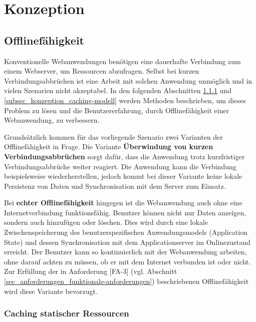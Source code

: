 \chapter{Konzeption}
\label{sec_konzeption}

\section{Offlinefähigkeit}
\label{sec_konzeption_offline}

Konventionelle Webanwendungen benötigen eine dauerhafte Verbindung zum einem Webserver, um Ressourcen abzufragen. Selbst bei kurzen Verbindungsabbrüchen ist eine Arbeit mit solchen Anwendung unmöglich und in vielen Szenarien nicht akzeptabel. In den folgenden Abschnitten \ref{subsec_konzept_caching-statische-ressourcen} und \ref{subsec_konzeption_caching-modell} werden Methoden beschrieben, um dieses Problem zu lösen und die Benutzererfahrung, durch Offlinefähigkeit einer Webanwendung, zu verbessern. 

Grundsätzlich kommen für das vorliegende Szenario zwei Varianten der Offlinefähigkeit in Frage. Die Variante \textbf{Überwindung von kurzen Verbindungsabbrüchen} sorgt dafür, dass die Anwendung trotz kurzfristiger Verbindungsabbrüche weiter reagiert. Die Anwendung kann die Verbindung beispielsweise wiederherstellen, jedoch kommt bei dieser Variante keine lokale Persistenz von Daten und Synchronisation mit dem Server zum Einsatz. 

Bei \textbf{\glqq{}echter\grqq{} Offlinefähigkeit} hingegen ist die Webanwendung auch ohne eine Internetverbindung funktionsfähig. Benutzer können nicht nur Daten anzeigen, sondern auch hinzufügen oder löschen. Dies wird durch eine lokale Zwischenspeicherung des benutzerspezifischen Anwendungsmodels (\glqq{}Application State\grqq{}) und dessen Synchronisation mit dem Applicationserver im Onlinezustand erreicht. Der Benutzer kann so kontinuierlich mit der Webanwendung arbeiten, ohne darauf achten zu müssen, ob er mit dem Internet verbunden ist oder nicht. \\
Zur Erfüllung der in Anforderung [FA-3] (vgl. Abschnitt \ref{sec_anforderungen_funktionale-anforderungen}) beschriebenen Offlinefähigkeit wird diese Variante bevorzugt.

\subsection{Caching statischer Ressourcen}
\label{subsec_konzept_caching-statische-ressourcen}

